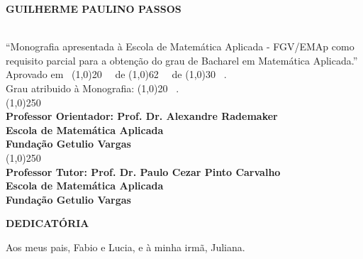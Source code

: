 \documentclass[12pt, a4paper, twoside]{article}
\theoremstyle{definition}
\newcommand{\supervisor}{Alexandre Rademaker}
\begin{document}
\begin{titlepage}
 \begin{center}
 
  {\bf \large \uppercase{Guilherme Paulino Passos}}\\[0.3cm]

  \vspace{25 mm}

  {\bf \large \usetitle}\\[3cm]

  {“Monografia apresentada à Escola de Matemática Aplicada  - FGV/EMAp como requisito parcial para a obtenção do grau de Bacharel em Matemática Aplicada.”}\\[3cm]


  {Aprovado em \ \line(1,0){20} \ \ de \line(1,0){62} \ \ de \line(1,0){30} \ .}\\[0.1cm]
  {Grau atribuido à Monografia: \line(1,0){20} \ . }\\[3cm]
  
  
  {\line(1,0){250}}\\
  {\bf Professor Orientador: Prof. Dr. \supervisor}\\[0.1cm]
  {\bf Escola de Matemática Aplicada}\\[0.1cm]
  {\bf Fundação Getulio Vargas}\\[1.5cm]
  
    {\line(1,0){250}}\\
    {\bf Professor Tutor: Prof. Dr. Paulo Cezar Pinto Carvalho}\\[0.1cm]
    {\bf Escola de Matemática Aplicada}\\[0.1cm]
    {\bf Fundação Getulio Vargas}
 \end{center}
\end{titlepage}

\newpage\null\thispagestyle{empty}\newpage

\newpage
\thispagestyle{empty}

\begin{center}
	\textbf{DEDICATÓRIA}
\end{center}
\vfill

	Aos meus pais, Fabio e Lucia, e à minha irmã, Juliana.

\clearpage
\end{document}
